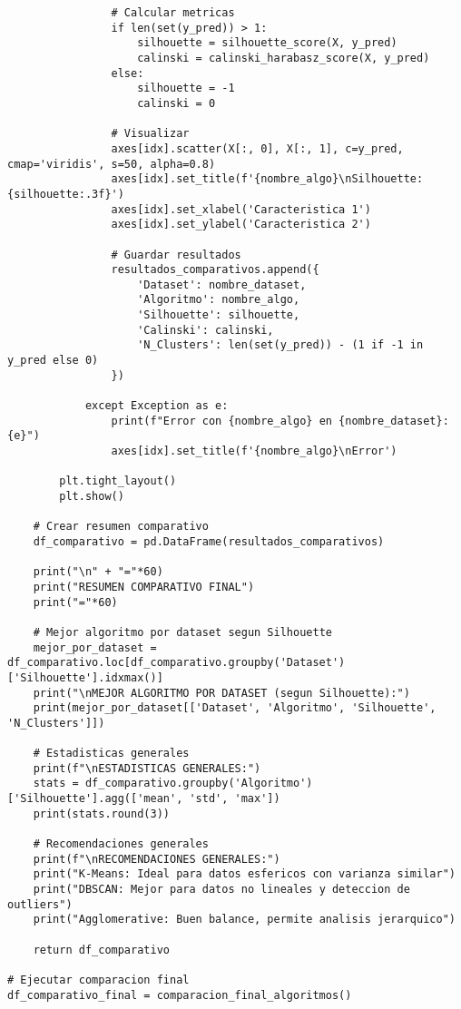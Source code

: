 \documentclass[12pt]{article}
\begin{document}
\begin{lstlisting}
                # Calcular metricas
                if len(set(y_pred)) > 1:
                    silhouette = silhouette_score(X, y_pred)
                    calinski = calinski_harabasz_score(X, y_pred)
                else:
                    silhouette = -1
                    calinski = 0
                
                # Visualizar
                axes[idx].scatter(X[:, 0], X[:, 1], c=y_pred, cmap='viridis', s=50, alpha=0.8)
                axes[idx].set_title(f'{nombre_algo}\nSilhouette: {silhouette:.3f}')
                axes[idx].set_xlabel('Caracteristica 1')
                axes[idx].set_ylabel('Caracteristica 2')
                
                # Guardar resultados
                resultados_comparativos.append({
                    'Dataset': nombre_dataset,
                    'Algoritmo': nombre_algo,
                    'Silhouette': silhouette,
                    'Calinski': calinski,
                    'N_Clusters': len(set(y_pred)) - (1 if -1 in y_pred else 0)
                })
                
            except Exception as e:
                print(f"Error con {nombre_algo} en {nombre_dataset}: {e}")
                axes[idx].set_title(f'{nombre_algo}\nError')
        
        plt.tight_layout()
        plt.show()
    
    # Crear resumen comparativo
    df_comparativo = pd.DataFrame(resultados_comparativos)
    
    print("\n" + "="*60)
    print("RESUMEN COMPARATIVO FINAL")
    print("="*60)
    
    # Mejor algoritmo por dataset segun Silhouette
    mejor_por_dataset = df_comparativo.loc[df_comparativo.groupby('Dataset')['Silhouette'].idxmax()]
    print("\nMEJOR ALGORITMO POR DATASET (segun Silhouette):")
    print(mejor_por_dataset[['Dataset', 'Algoritmo', 'Silhouette', 'N_Clusters']])
    
    # Estadisticas generales
    print(f"\nESTADISTICAS GENERALES:")
    stats = df_comparativo.groupby('Algoritmo')['Silhouette'].agg(['mean', 'std', 'max'])
    print(stats.round(3))
    
    # Recomendaciones generales
    print(f"\nRECOMENDACIONES GENERALES:")
    print("K-Means: Ideal para datos esfericos con varianza similar")
    print("DBSCAN: Mejor para datos no lineales y deteccion de outliers")
    print("Agglomerative: Buen balance, permite analisis jerarquico")
    
    return df_comparativo

# Ejecutar comparacion final
df_comparativo_final = comparacion_final_algoritmos()
\end{lstlisting}
\end{document}
